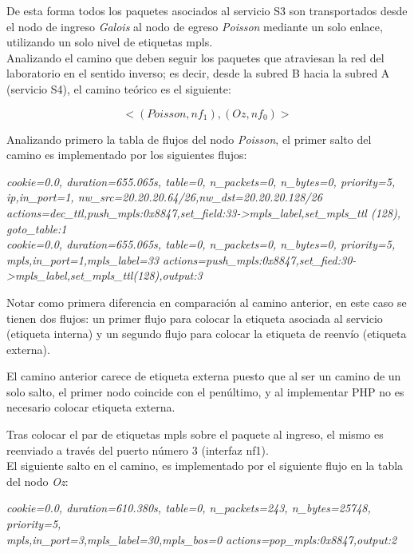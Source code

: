 De esta forma todos los paquetes asociados al servicio S3 son transportados desde el nodo de ingreso \textit{Galois} al nodo de egreso \textit{Poisson} mediante un solo enlace, utilizando un solo nivel de etiquetas mpls.\\

Analizando el camino que deben seguir los paquetes que atraviesan la red del laboratorio en el sentido inverso; es decir, desde la subred B hacia la subred A (servicio S4), el camino teórico es el siguiente:

$$<(Poisson, nf_1), (Oz, nf_0)>$$ 

Analizando primero la tabla de flujos del nodo \textit{Poisson}, el primer salto del camino es implementado por los siguientes flujos:

\begin{center}
\textit{cookie=0.0, duration=655.065s, table=0, n\_packets=0, n\_bytes=0, priority=5, \\
ip,in\_port=1, nw\_src=20.20.20.64/26,nw\_dst=20.20.20.128/26 \\
actions=dec\_ttl,push\_mpls:0x8847,set\_field:33->mpls\_label,set\_mpls\_ttl (128), goto\_table:1 \\
cookie=0.0, duration=655.065s, table=0, n\_packets=0, n\_bytes=0, priority=5, \\
mpls,in\_port=1,mpls\_label=33 actions=push\_mpls:0x8847,set\_fied:30->mpls\_label,set\_mpls\_ttl(128),output:3
}
\end{center}

Notar como primera diferencia en comparación al camino anterior, en este caso se tienen dos flujos: un primer flujo para colocar la etiqueta asociada al servicio (etiqueta interna) y un segundo flujo para colocar la etiqueta de reenvío (etiqueta externa). 

El camino anterior carece de etiqueta externa puesto que al ser un camino de un solo salto, el primer nodo coincide con el pen\'ultimo, y al implementar PHP no es necesario colocar etiqueta externa. 

Tras colocar el par de etiquetas mpls sobre el paquete al ingreso, el mismo es reenviado a trav\'es del puerto n\'umero 3 (interfaz nf1).\\

El siguiente salto en el camino, es implementado por el siguiente flujo en la tabla del nodo \textit{Oz}:

\begin{center}
\textit{cookie=0.0, duration=610.380s, table=0, n\_packets=243, n\_bytes=25748, priority=5, \\
mpls,in\_port=3,mpls\_label=30,mpls\_bos=0 actions=pop\_mpls:0x8847,output:2 }
\end{center}

